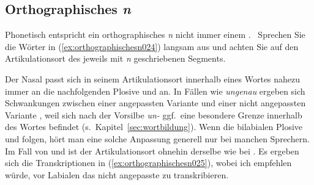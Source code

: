 \begin{exe}
  \ex\label{ex:silbischenasaleundapproximanten023}
  \begin{xlist}
  \end{xlist}
\end{exe}

\subsection{Orthographisches \textit{n}}
\label{sec:orthographischesn}

Phonetisch entspricht ein orthographisches \textit{n} nicht immer einem \textipa{[n]}.
\TuBegin~Sprechen Sie die Wörter in (\ref{ex:orthographischesn024}) langsam aus und achten Sie auf den Artikulationsort des jeweils mit \textit{n} geschriebenen Segments.

\begin{exe}
  \ex\label{ex:orthographischesn024}
  \begin{xlist}
  \end{xlist}
\end{exe}

Der Nasal \textipa{[n]} passt sich in seinem Artikulationsort innerhalb eines Wortes nahezu immer an die nachfolgenden Plosive \textipa{[k]} und \textipa{[g]} an.
In Fällen wie \textit{ungenau} ergeben sich Schwankungen zwischen einer angepassten Variante \textipa{[PUNgen\t{aO}]} und einer nicht angepassten Variante \textipa{[PUngen\t{aO}]}, weil sich nach der Vorsilbe \textit{un-} ggf.\ eine besondere Grenze innerhalb des Wortes befindet (s.\ Kapitel~\ref{sec:wortbildung}).
Wenn die bilabialen Plosive \textipa{[p]} und \textipa{[b]} folgen, hört man eine solche Anpassung generell nur bei manchen Sprechern.
Im Fall von \textipa{[t]} und \textipa{[d]} ist der Artikulationsort ohnehin derselbe wie bei \textipa{[n]}.
Es ergeben sich die Transkriptionen in (\ref{ex:orthographischesn025}), wobei ich empfehlen würde, vor Labialen das nicht angepasste \textipa{[n]} zu transkribieren.

